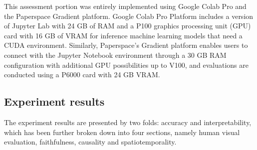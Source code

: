 \documentclass{svproc}
\begin{document}
This assessment portion was entirely implemented using Google Colab Pro and the Paperspace Gradient platform. Google Colab Pro Platform includes a version of Jupyter Lab with 24 GB of RAM and a P100 graphics processing unit (GPU) card with 16 GB of VRAM for inference machine learning models that need a CUDA environment. Similarly, Paperspace's Gradient platform enables users to connect with the Jupyter Notebook environment through a 30 GB RAM configuration with additional GPU possibilities up to V100, and evaluations are conducted using a P6000 card with 24 GB VRAM. 

\subsection{Experiment results}

The experiment results are presented by two folds: accuracy and interpretability, which has been further broken down into four sections, namely human visual evaluation, faithfulness, causality and spatiotemporality.
\end{document}
